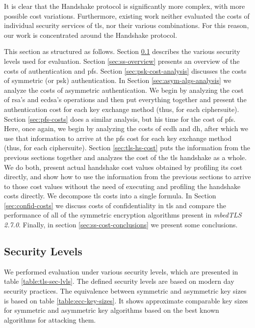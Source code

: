 \documentclass{llncs}
\begin{document}
It is clear that the Handshake protocol is significantly more complex, with more possible cost variations.
Furthermore, existing work neither evaluated the costs of individual security services of \gls{tls}, nor
their various combinations. For this reason, our work is concentrated around the Handshake protocol.

This section as structured as follows. Section \ref{sec:sls} describes the various security levels used for evaluation. 
Section \ref{sec:ss-overview}
presents an overview of the costs of authentication and \gls{pfs}. Section \ref{sec:psk-cost-analysis} discusses the costs of symmetric (or \gls{psk})
authentication. In Section \ref{sec:asym-algs-analysis} we analyze the costs of asymmetric authentication. We begin by analyzing the cost of \gls{rsa}'s
and \gls{ecdsa}'s  operations and then put everything together and present the authentication cost for each key exchange method (thus, for each ciphersuite).
Section \ref{sec:pfs-costs} does a similar analysis, but his time for the cost of \gls{pfs}. Here, once again, we begin by analyzing the costs of
\gls{ecdh} and \gls{dh}, after which we use that information to arrive at the \gls{pfs} cost for each key exchange method (thus, for each ciphersuite).
Section \ref{sec:tls-hs-cost} puts the information from the previous sections together and analyzes the cost of the \gls{tls} handshake as a whole.
We do both, present actual handshake cost values obtained by profiling its cost directly, and show how to use the information from the previous sections to 
arrive to those cost values without the need of executing and profiling the handshake costs directly. We decompose \gls{tls} costs into a single formula.
In Section \ref{sec:confid-costs} we discuss costs of confidentiality in \gls{tls} and compare the performance of all of the symmetric encryption algorithms
present in \textit{mbedTLS 2.7.0}. Finally, in section \ref{sec:ss-cost-conclusions} we present some conclusions.

\subsection{Security Levels} \label{sec:sls}

We performed evaluation under various security levels, which are presented in table \ref{table:tls-sec-lvls}.
The defined security levels are based on modern day security practices. The equivalence between symmetric and asymmetric
key sizes  is based on table \ref{table:ecc-key-sizes}. It shows approximate comparable key sizes for symmetric
and asymmetric key algorithms based on the best known algorithms for attacking them\cite{RFC4492}.
\end{document}
